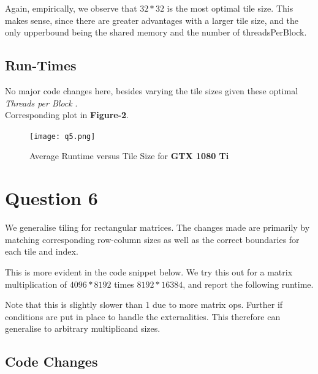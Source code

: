 Again, empirically, we observe that $32 *32$ is the most optimal tile size. This makes sense, since there are greater advantages with a larger tile size, and the only upperbound being the shared memory and the number of threadsPerBlock.
 
 \subsection{Run-Times}
 
 No major code changes here, besides varying the tile sizes given these optimal \textit{Threads per Block} .\\
 
 Corresponding plot in \textbf{Figure-2}.
 
 \begin{figure}[ht]
\centering
\texttt{[image: q5.png]}
\caption{Average Runtime versus Tile Size for \textbf{GTX 1080 Ti}}
\end{figure}

\section{Question 6}

We generalise tiling for rectangular matrices. The changes made are primarily by matching corresponding row-column sizes as well as the correct boundaries for each tile and index.

This is more evident in the code snippet below. We try this out for a matrix multiplication of $4096 * 8192$ times $8192*16384$, and report the following runtime.

Note that this is slightly slower than 1 due to more matrix ops. Further if conditions are put in place to handle the externalities. This therefore can generalise to arbitrary multiplicand sizes.

\subsection{Code Changes} 

